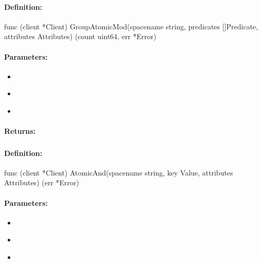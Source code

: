 \paragraph{Definition:}
\begin{gocode}
func (client *Client) GroupAtomicMod(spacename string, predicates []Predicate, attributes Attributes) (count uint64, err *Error)
\end{gocode}

\paragraph{Parameters:}
\begin{itemize}[noitemsep]
\item {}\\

\item {}\\

\item {}\\

\end{itemize}

\paragraph{Returns:}


\pagebreak
\subsubsection{}
\label{api:Go:AtomicAnd}


\paragraph{Definition:}
\begin{gocode}
func (client *Client) AtomicAnd(spacename string, key Value, attributes Attributes) (err *Error)
\end{gocode}

\paragraph{Parameters:}
\begin{itemize}[noitemsep]
\item {}\\

\item {}\\

\item {}\\

\end{itemize}

